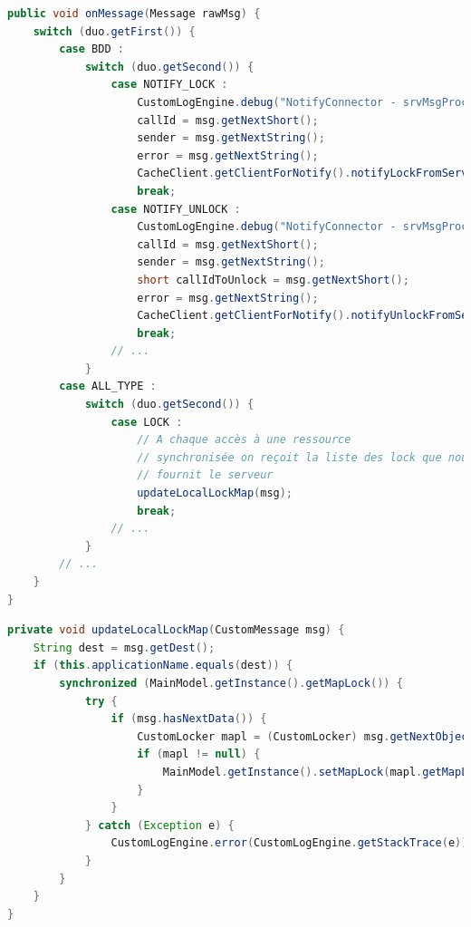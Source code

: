 \begin{minipage}{\linewidth}
	\begin{lstlisting}[language=Java, caption="Gestion des verrous à la réception d'un message côté client", label={lst:lock_un}]
public void onMessage(Message rawMsg) {
    switch (duo.getFirst()) {
        case BDD :
            switch (duo.getSecond()) {
                case NOTIFY_LOCK :
                    CustomLogEngine.debug("NotifyConnector - srvMsgProcess : notify lock");
                    callId = msg.getNextShort();
                    sender = msg.getNextString();
                    error = msg.getNextString();
                    CacheClient.getClientForNotify().notifyLockFromServer(error, callId);
                    break;
                case NOTIFY_UNLOCK :
                    CustomLogEngine.debug("NotifyConnector - srvMsgProcess : notify lock");
                    callId = msg.getNextShort();
                    sender = msg.getNextString();
                    short callIdToUnlock = msg.getNextShort();
                    error = msg.getNextString();
                    CacheClient.getClientForNotify().notifyUnlockFromServer(error, callIdToUnlock, callId); 
                    break;
                // ...
            }
        case ALL_TYPE :
            switch (duo.getSecond()) {
                case LOCK :
                    // A chaque accès à une ressource
                    // synchronisée on reçoit la liste des lock que nous
                    // fournit le serveur
                    updateLocalLockMap(msg);
                    break;
                // ...
            }
        // ...
    }
}
    \end{lstlisting}
\end{minipage}

\begin{minipage}{\linewidth}
	\begin{lstlisting}[language=Java, caption="Méthode permettant de mettre à jour les ressources verrouillées", label={lst:lock_deux}]
private void updateLocalLockMap(CustomMessage msg) {
    String dest = msg.getDest();
    if (this.applicationName.equals(dest)) {
        synchronized (MainModel.getInstance().getMapLock()) {
            try {
                if (msg.hasNextData()) {
                    CustomLocker mapl = (CustomLocker) msg.getNextObject();
                    if (mapl != null) {
                        MainModel.getInstance().setMapLock(mapl.getMapLock());
                    }
                }
            } catch (Exception e) {
                CustomLogEngine.error(CustomLogEngine.getStackTrace(e));
            }
        }
    }
}
    \end{lstlisting}
\end{minipage}

